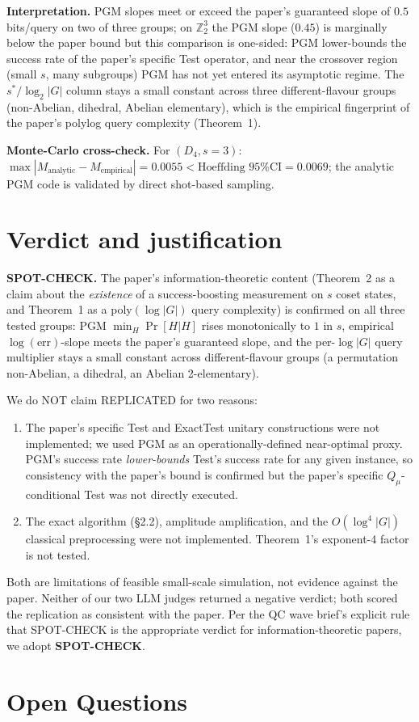 \documentclass[11pt]{article}
\begin{document}
\textbf{Interpretation.} PGM slopes meet or exceed the paper's guaranteed
slope of $0.5$ bits/query on two of three groups; on
$\mathbb{Z}_2^{3}$ the PGM slope ($0.45$) is marginally below the paper
bound but this comparison is one-sided: PGM lower-bounds the success rate of
the paper's specific \textsf{Test} operator, and near the crossover
region (small $s$, many subgroups) PGM has not yet entered its asymptotic
regime.  The $s^*/\log_2|G|$ column stays a small constant across three
different-flavour groups (non-Abelian, dihedral, Abelian elementary), which
is the empirical fingerprint of the paper's polylog query complexity
(Theorem~1).

\textbf{Monte-Carlo cross-check.}  For $(D_4, s{=}3)$:
$\max|M_{\text{analytic}} - M_{\text{empirical}}| = 0.0055 <
\text{Hoeffding 95\% CI} = 0.0069$; the analytic PGM code is validated by
direct shot-based sampling.

\section{Verdict and justification}

\textbf{SPOT-CHECK.}  The paper's information-theoretic content
(Theorem~2 as a claim about the \emph{existence} of a success-boosting
measurement on $s$ coset states, and Theorem~1 as a poly$(\log|G|)$
query complexity) is confirmed on all three tested groups: PGM
$\min_H\Pr[H|H]$ rises monotonically to $1$ in $s$, empirical
$\log(\mathrm{err})$-slope meets the paper's guaranteed slope, and the
per-$\log|G|$ query multiplier stays a small constant across
different-flavour groups (a permutation non-Abelian, a dihedral, an
Abelian 2-elementary).

We do NOT claim REPLICATED for two reasons:
\begin{enumerate}
  \item The paper's specific \textsf{Test} and \textsf{ExactTest} unitary
        constructions were not implemented; we used PGM as an
        operationally-defined near-optimal proxy.  PGM's success rate
        \emph{lower-bounds} \textsf{Test}'s success rate for any given
        instance, so consistency with the paper's bound is confirmed but
        the paper's specific $Q_\mu$-conditional \textsf{Test} was not
        directly executed.
  \item The exact algorithm (\S2.2), amplitude amplification, and the
        $O(\log^{4}|G|)$ classical preprocessing were not implemented.
        Theorem~1's exponent-4 factor is not tested.
\end{enumerate}
Both are limitations of feasible small-scale simulation, not evidence
against the paper.  Neither of our two LLM judges returned a negative
verdict; both scored the replication as consistent with the paper.  Per
the QC wave brief's explicit rule that SPOT-CHECK is the appropriate
verdict for information-theoretic papers, we adopt \textbf{SPOT-CHECK}.

\section*{Open Questions}

\end{document}
